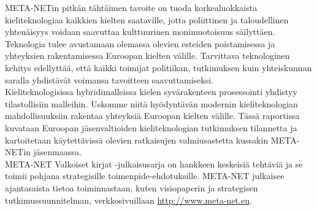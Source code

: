 \begin{multicols}{2}


META-NETin pitkän tähtäimen tavoite on tuoda korkealuokkaista
kieliteknologiaa kaikkien kielten saataville, jotta poliittinen ja 
taloudellinen yhtenäisyys voidaan saavuttaa kulttuurinen monimuotoisuus
säilyttäen. Teknologia tulee avustamaan olemassa olevien esteiden
poistamisessa ja yhteyksien rakentamisessa Euroopan kielten
välille. Tarvittava teknologinen kehitys edellyttää, että kaikki
toimijat politiikan, tutkimuksen kuin yhteiskunnan saralla yhdistävät
voimansa tavoitteen saavuttamiseksi.\\
Kieliteknologisissa hybridimalleissa kielen syvärakenteen prosessointi
yhdistyy tilastollisiin malleihin. Uskomme niitä hyödyntävän modernin
kieliteknologian mahdollisuuksiin rakentaa yhteyksiä Euroopan kielten
välille. Tässä raportissa kuvataan Euroopan jäsenvaltioiden
kieliteknologian tutkimuksen tilannetta ja kartoitetaan käytettävissä
olevien ratkaisujen valmiusastetta kussakin META-NETin jäsenmaassa.\\
META-NET Valkoiset kirjat -julkaisusarja on hankkeen keskeisiä tehtäviä ja 
se toimii pohjana strategisille toimenpide-ehdotuksille. META-NET julkaisee 
ajantasaista tietoa toiminnastaan, kuten visiopaperin \cite{Vision} ja 
strategisen tutkimussuunnitelman, verkkosivuillaan \url{http://www.meta-net.eu}.


\end{multicols}

\clearpage

